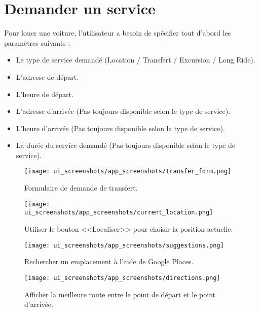 \section{Demander un service}
Pour louer une voiture, l'utilisateur a besoin de spécifier tout d'abord les paramètres suivants :
\begin{itemize}
    \item Le type de service demandé (Location / Transfert / Excursion / Long Ride).
    \item L'adresse de départ.
    \item L'heure de départ.
    \item L'adresse d'arrivée (Pas toujours disponible selon le type de service).
    \item L'heure d'arrivée (Pas toujours disponible selon le type de service).
    \item La durée du service demandé (Pas toujours disponible selon le type de service).
\end{itemize}
\vspace{1cm}
\clearpage
\vspace{1cm}
\begin{multicols}{2}
    \begin{figure}[H]
        \centering
        \texttt{[image: ui\_screenshots/app\_screenshots/transfer\_form.png]}
        \captionsetup{justification=centering}
        \caption{Formulaire de demande de transfert.}
        \label{fig:app_transfer}
    \end{figure}
    \begin{figure}[H]
        \centering
        \texttt{[image: ui\_screenshots/app\_screenshots/current\_location.png]}
        \captionsetup{justification=centering}
        \caption{Utiliser le bouton <<Localiser>> pour choisir la position actuelle.}
        \label{fig:app_transfer_current_pos}
    \end{figure}
\end{multicols}
\begin{multicols}{2}
    \begin{figure}[H]
        \centering
        \texttt{[image: ui\_screenshots/app\_screenshots/suggestions.png]}
        \captionsetup{justification=centering}
        \caption{Rechercher un emplacement à l'aide de Google Places.}
        \label{fig:app_transfer_suggestions}
    \end{figure}
    \begin{figure}[H]
        \centering
        \texttt{[image: ui\_screenshots/app\_screenshots/directions.png]}
        \captionsetup{justification=centering}
        \caption{Afficher la meilleure route entre le point de départ et le point d'arrivée.}
        \label{fig:app_transfer_directions}
    \end{figure}
\end{multicols}
